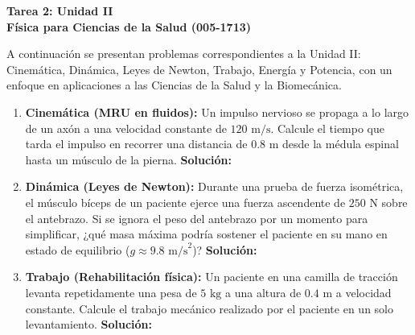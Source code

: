 \documentclass[12pt,letterpaper]{article}
\begin{document}
\begin{center}
    \textbf{\Large Tarea 2: Unidad II}\\
    \vspace{0.2cm}
    \textbf{Física para Ciencias de la Salud (005-1713)}\\
\end{center}

\vspace{0.5cm}
\noindent A continuación se presentan problemas correspondientes a la Unidad II: Cinemática, Dinámica, Leyes de Newton, Trabajo, Energía y Potencia, con un enfoque en aplicaciones a las Ciencias de la Salud y la Biomecánica.

\vspace{0.5cm}

\begin{enumerate}

    \item \textbf{Cinemática (MRU en fluidos):} Un impulso nervioso se propaga a lo largo de un axón a una velocidad constante de $120 \text{ m/s}$. Calcule el tiempo que tarda el impulso en recorrer una distancia de $0.8 \text{ m}$ desde la médula espinal hasta un músculo de la pierna.
    \textbf{Solución:} \\

    \item \textbf{Dinámica (Leyes de Newton):} Durante una prueba de fuerza isométrica, el músculo bíceps de un paciente ejerce una fuerza ascendente de $250 \text{ N}$ sobre el antebrazo. Si se ignora el peso del antebrazo por un momento para simplificar, ¿qué masa máxima podría sostener el paciente en su mano en estado de equilibrio ($g \approx 9.8 \text{ m/s}^2$)?
    \textbf{Solución:} \\

    \item \textbf{Trabajo (Rehabilitación física):} Un paciente en una camilla de tracción levanta repetidamente una pesa de $5 \text{ kg}$ a una altura de $0.4 \text{ m}$ a velocidad constante. Calcule el trabajo mecánico realizado por el paciente en un solo levantamiento.
    \textbf{Solución:} \\

\end{enumerate}
\end{document}
